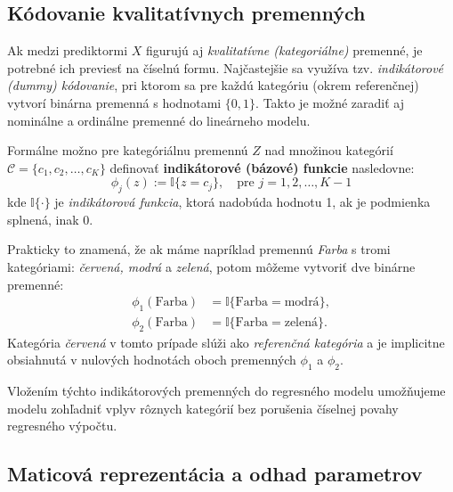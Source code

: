 \subsection{Kódovanie kvalitatívnych premenných}

Ak medzi prediktormi $X$ figurujú aj \textit{kvalitatívne (kategoriálne)} premenné, je potrebné ich previesť na číselnú formu. Najčastejšie sa využíva tzv. \textit{indikátorové (dummy) kódovanie}, pri ktorom sa pre každú kategóriu (okrem referenčnej) vytvorí binárna premenná s hodnotami $\{0, 1\}$. Takto je možné zaradiť aj nominálne a ordinálne premenné do lineárneho modelu.

Formálne možno pre kategóriálnu premennú $Z$ nad množinou kategórií $\mathcal{C} = \{c_1, c_2, \dots, c_K\}$ definovať \textbf{indikátorové (bázové) funkcie} nasledovne:
\begin{equation}
\phi_j(z) := \mathbb{I}\{z = c_j\}, \quad \text{pre } j = 1, 2, \dots, K-1
\end{equation}
kde $\mathbb{I}\{\cdot\}$ je \textit{indikátorová funkcia}, ktorá nadobúda hodnotu 1, ak je podmienka splnená, inak 0.

Prakticky to znamená, že ak máme napríklad premennú \textit{Farba} s tromi kategóriami: \textit{červená, modrá} a \textit{zelená}, potom môžeme vytvoriť dve binárne premenné:
\begin{align*}
\phi_1(\text{Farba}) &= \mathbb{I}\{\text{Farba} = \text{modrá}\}, \\
\phi_2(\text{Farba}) &= \mathbb{I}\{\text{Farba} = \text{zelená}\}.
\end{align*}
Kategória \textit{červená} v tomto prípade slúži ako \textit{referenčná kategória} a je implicitne obsiahnutá v nulových hodnotách oboch premenných $\phi_1$ a $\phi_2$.

Vložením týchto indikátorových premenných do regresného modelu umožňujeme modelu zohľadniť vplyv rôznych kategórií bez porušenia číselnej povahy regresného výpočtu.

\subsection{Maticová reprezentácia a odhad parametrov}


